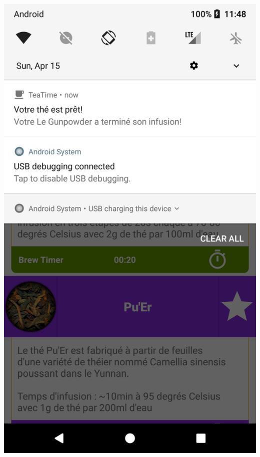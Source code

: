 \documentclass[a4paper,12pt]{article}
\begin{document}
\begin{spacing}{1}
	\includegraphics*[scale=0.1]{Screenshot/13.png}    

\end{spacing}
\end{document}

